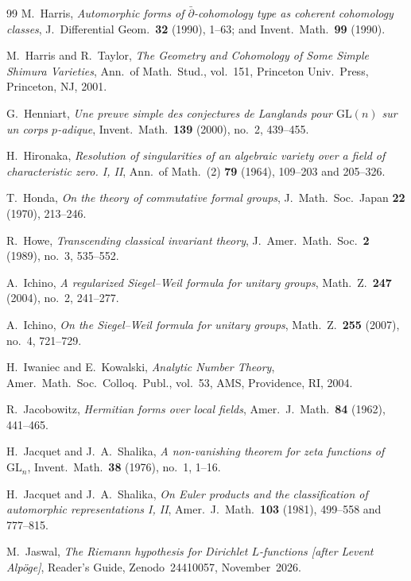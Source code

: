 \begin{thebibliography}{99}
M.~Harris,
\emph{Automorphic forms of $\bar{\partial}$-cohomology type as coherent cohomology classes},
J.\ Differential Geom.\ \textbf{32} (1990), 1--63; and Invent.\ Math.\ \textbf{99} (1990).

M.~Harris and R.~Taylor,
\emph{The Geometry and Cohomology of Some Simple Shimura Varieties},
Ann.\ of Math.\ Stud., vol.~151, Princeton Univ.\ Press, Princeton, NJ, 2001.

G.~Henniart,
\emph{Une preuve simple des conjectures de Langlands pour $\mathrm{GL}(n)$ sur un corps $p$-adique},
Invent.\ Math.\ \textbf{139} (2000), no.~2, 439--455.

H.~Hironaka,
\emph{Resolution of singularities of an algebraic variety over a field of characteristic zero. I, II},
Ann.\ of Math.\ (2) \textbf{79} (1964), 109--203 and 205--326.

T.~Honda,
\emph{On the theory of commutative formal groups},
J.\ Math.\ Soc.\ Japan \textbf{22} (1970), 213--246.

R.~Howe,
\emph{Transcending classical invariant theory},
J.\ Amer.\ Math.\ Soc.\ \textbf{2} (1989), no.~3, 535--552.

A.~Ichino,
\emph{A regularized Siegel--Weil formula for unitary groups},
Math.\ Z.\ \textbf{247} (2004), no.~2, 241--277.

A.~Ichino,
\emph{On the Siegel--Weil formula for unitary groups},
Math.\ Z.\ \textbf{255} (2007), no.~4, 721--729.

H.~Iwaniec and E.~Kowalski,
\emph{Analytic Number Theory},
Amer.\ Math.\ Soc.\ Colloq.\ Publ., vol.~53, AMS, Providence, RI, 2004.

R.~Jacobowitz,
\emph{Hermitian forms over local fields},
Amer.\ J.\ Math.\ \textbf{84} (1962), 441--465.

H.~Jacquet and J.~A.~Shalika,
\emph{A non-vanishing theorem for zeta functions of $\mathrm{GL}_n$},
Invent.\ Math.\ \textbf{38} (1976), no.~1, 1--16.

H.~Jacquet and J.~A.~Shalika,
\emph{On Euler products and the classification of automorphic representations I, II},
Amer.\ J.\ Math.\ \textbf{103} (1981), 499--558 and 777--815.

M.~Jaswal,
\emph{The Riemann hypothesis for Dirichlet $L$-functions [after Levent Alp\"oge]},
Reader's Guide, Zenodo~24410057, November~2026.


\end{thebibliography}
